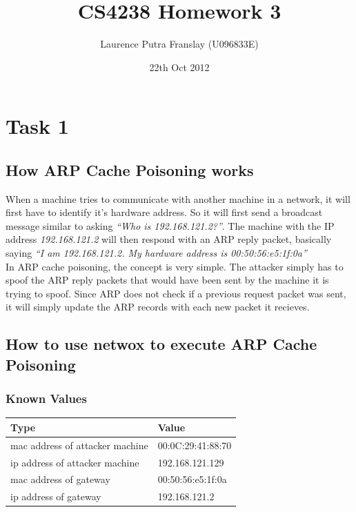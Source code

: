 \documentclass[12pt]{article}
\begin{document}
\title{CS4238 Homework 3}
\author{Laurence Putra Franslay (U096833E)}
\date{22th Oct 2012}
\maketitle

\section{Task 1}
\subsection{How ARP Cache Poisoning works}
When a machine tries to communicate with another machine in a network, it will first have to identify it's hardware address. So it will first send a broadcast message similar to asking \emph{``Who is 192.168.121.2?''}. The machine with the IP address \emph{192.168.121.2} will then respond with an ARP reply packet, basically saying \emph{``I am 192.168.121.2. My hardware address is 00:50:56:e5:1f:0a''}\\


In ARP cache poisoning, the concept is very simple. The attacker simply has to spoof the ARP reply packets that would have been sent by the machine it is trying to spoof. Since ARP does not check if a previous request packet was sent, it will simply update the ARP records with each new packet it recieves. \\

\subsection{How to use netwox to execute ARP Cache Poisoning}
\subsubsection{Known Values}
\begin{table}[here]
\centering
\begin{tabularx}{0.7\textwidth}{ | l | X | }
\hline
Type								&	Value \\
\hline
mac address of attacker machine		&	00:0C:29:41:88:70\\
\hline
ip address of attacker machine		& 	192.168.121.129\\
\hline
mac address of gateway				&	00:50:56:e5:1f:0a\\
\hline
ip address of gateway				& 	192.168.121.2\\
\hline
\end{tabularx}
\end{table}
\end{document}
